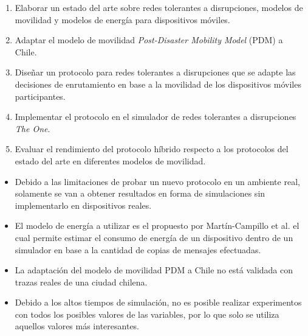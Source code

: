 {
\begin{enumerate}
    \item Elaborar un estado del arte sobre redes tolerantes a disrupciones,
      modelos de movilidad y modelos de energía para dispositivos móviles.
    \item Adaptar el modelo de movilidad \textit{Post-Disaster Mobility Model}
      (PDM) \cite{uddin_post-disaster_2009} a Chile.
    \item \label{objetivo-diseno} Diseñar un protocolo para redes tolerantes a
      disrupciones que se adapte las decisiones de enrutamiento en base a la
      movilidad de los dispositivos móviles participantes.  
    \item Implementar el protocolo en el simulador de redes tolerantes a
      disrupciones \textit{The One}.
    \item Evaluar el rendimiento del protocolo híbrido respecto a los protocolos
      del estado del arte en diferentes modelos de movilidad.
\end{enumerate}
}


\newpage
{}


\begin{itemize}
    \item Debido a las limitaciones de probar un nuevo protocolo en un ambiente
    real, solamente se van a obtener resultados en forma de simulaciones sin
    implementarlo en dispositivos reales.
    \item El modelo de energía a utilizar es el propuesto por Martín-Campillo et
      al. \cite{martin-campillo_energy-efficient_2012} el cual permite estimar
      el consumo de energía de un dispositivo dentro de un simulador en base a
      la cantidad de copias de mensajes efectuadas.
    \item La adaptación del modelo de movilidad PDM a Chile no está validada con
      trazas reales de una ciudad chilena.
    \item Debido a los altos tiempos de simulación, no es posible realizar
      experimentos con todos los posibles valores de las variables, por lo que
      solo se utiliza aquellos valores más interesantes.
\end{itemize}










